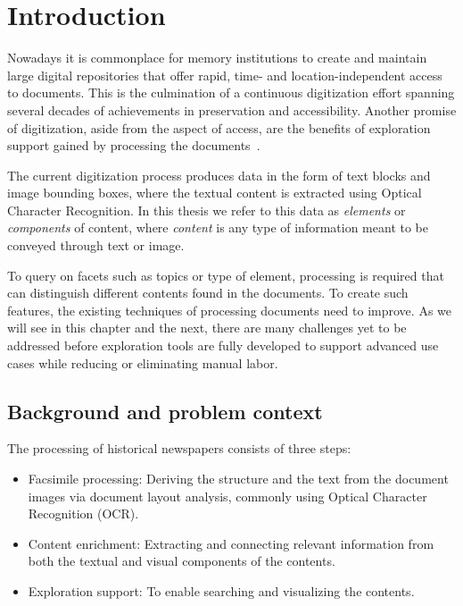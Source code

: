 \documentclass[oneside, english, bibtex]{kththesis}
\begin{document}
\chapter{Introduction}
\label{ch:introduction}

Nowadays it is commonplace for memory institutions to create and maintain large digital repositories that offer rapid, time- and location-independent access to documents.
This is the culmination of a continuous digitization effort spanning several decades of achievements in preservation and accessibility. Another promise of digitization, aside from the aspect of access, are the benefits of exploration support gained by processing the documents~\cite{jdmdh:7097}.

The current digitization process produces data in the form of text blocks and image bounding boxes, where the textual content is extracted using Optical Character Recognition. In this thesis we refer to this data as \textit{elements} or \textit{components} of content, where \textit{content} is any type of information meant to be conveyed through text or image.

To query on facets such as topics or type of element, processing is required that can distinguish different contents found in the documents.
To create such features, the existing techniques of processing documents need to improve.
As we will see in this chapter and the next, there are many challenges yet to be addressed before exploration tools are fully developed to support advanced use cases while reducing or eliminating manual labor.


\section{Background and problem context}
\label{sec:background}

The processing of historical newspapers consists of three steps:
\begin{itemize}
\item Facsimile processing: Deriving the structure and the text from the document images via document layout analysis, commonly using Optical Character Recognition (\gls{OCR}).
\item Content enrichment: Extracting and connecting relevant information from both the textual and visual components of the contents.
\item Exploration support: To enable searching and visualizing the contents.
\end{itemize}
\end{document}
